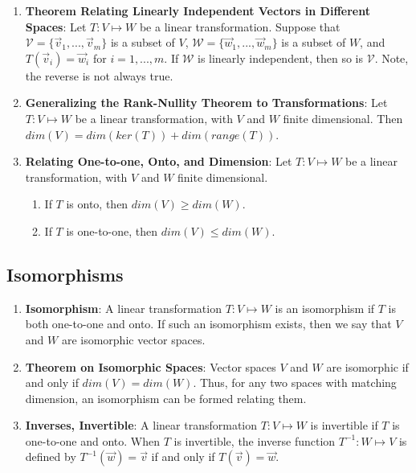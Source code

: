\documentclass[10pt]{article}
\begin{document}
\begin{enumerate}
\item \textbf{Theorem Relating Linearly Independent Vectors in Different Spaces}: Let $T: V \mapsto W$ be a linear transformation. Suppose that $\mathcal{V} = \lbrace \vec{v}_1,...,\vec{v}_m \rbrace$ is a subset of $V$, $\mathcal{W} = \lbrace \vec{w}_1,...,\vec{w}_m \rbrace$ is a subset of $W$, and $T(\vec{v}_i) = \vec{w}_i$ for $i = 1,...,m$. If $\mathcal{W}$ is linearly independent, then so is $\mathcal{V}$. Note, the reverse is not always true.
\item \textbf{Generalizing the Rank-Nullity Theorem to Transformations}: Let $T: V \mapsto W$ be a linear transformation, with $V$ and $W$ finite dimensional. Then $dim(V) = dim(ker(T)) + dim(range(T))$.
\item \textbf{Relating One-to-one, Onto, and Dimension}: Let $T: V \mapsto W$ be a linear transformation, with $V$ and $W$ finite dimensional. 
\begin{enumerate}
\item If $T$ is onto, then $dim(V) \geq dim(W)$.
\item If $T$ is one-to-one, then $dim(V) \leq dim(W)$.
\end{enumerate}
\end{enumerate}
\subsection{Isomorphisms}
\begin{enumerate}
\item \textbf{Isomorphism}: A linear transformation $T: V \mapsto W$ is an isomorphism if $T$ is both one-to-one and onto. If such an isomorphism exists, then we say that $V$ and $W$ are isomorphic vector spaces. 
\item \textbf{Theorem on Isomorphic Spaces}: Vector spaces $V$ and $W$ are isomorphic if and only if $dim(V) = dim(W)$. Thus, for any two spaces with matching dimension, an isomorphism can be formed relating them.
\item \textbf{Inverses, Invertible}: A linear transformation $T: V \mapsto W$ is invertible if $T$ is one-to-one and onto. When $T$ is invertible, the inverse function $T^{-1}: W \mapsto V$ is defined by $T^{-1}(\vec{w}) = \vec{v}$ if and only if $T(\vec{v}) = \vec{w}$.
\end{enumerate}
\end{document}
